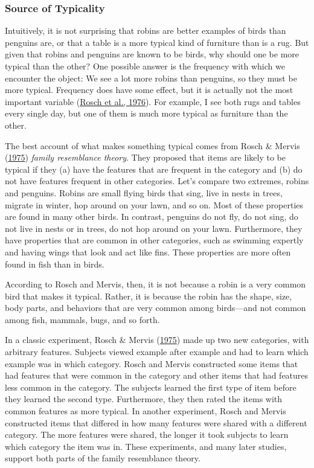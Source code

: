\documentclass[
]{krantz}
\begin{document}
\hypertarget{source-of-typicality}{%
\subsubsection*{Source of Typicality}\label{source-of-typicality}}


Intuitively, it is not surprising that robins are better examples of birds than penguins are, or that a table is a more typical kind of furniture than is a rug. But given that robins and penguins are known to be birds, why should one be more typical than the other? One possible answer is the frequency with which we encounter the object: We see a lot more robins than penguins, so they must be more typical. Frequency does have some effect, but it is actually not the most important variable (\protect\hyperlink{ref-Rosch1976}{Rosch et al., 1976}). For example, I see both rugs and tables every single day, but one of them is much more typical as furniture than the other.

The best account of what makes something typical comes from Rosch \& Mervis (\protect\hyperlink{ref-Rosch1975}{1975}) \emph{family resemblance theory}. They proposed that items are likely to be typical if they (a) have the features that are frequent in the category and (b) do not have features frequent in other categories. Let's compare two extremes, robins and penguins. Robins are small flying birds that sing, live in nests in trees, migrate in winter, hop around on your lawn, and so on. Most of these properties are found in many other birds. In contrast, penguins do not fly, do not sing, do not live in nests or in trees, do not hop around on your lawn. Furthermore, they have properties that are common in other categories, such as swimming expertly and having wings that look and act like fins. These properties are more often found in fish than in birds.

According to Rosch and Mervis, then, it is not because a robin is a very common bird that makes it typical. Rather, it is because the robin has the shape, size, body parts, and behaviors that are very common among birds---and not common among fish, mammals, bugs, and so forth.

In a classic experiment, Rosch \& Mervis (\protect\hyperlink{ref-Rosch1975}{1975}) made up two new categories, with arbitrary features. Subjects viewed example after example and had to learn which example was in which category. Rosch and Mervis constructed some items that had features that were common in the category and other items that had features less common in the category. The subjects learned the first type of item before they learned the second type. Furthermore, they then rated the items with common features as more typical. In another experiment, Rosch and Mervis constructed items that differed in how many features were shared with a different category. The more features were shared, the longer it took subjects to learn which category the item was in. These experiments, and many later studies, support both parts of the family resemblance theory.
\end{document}

